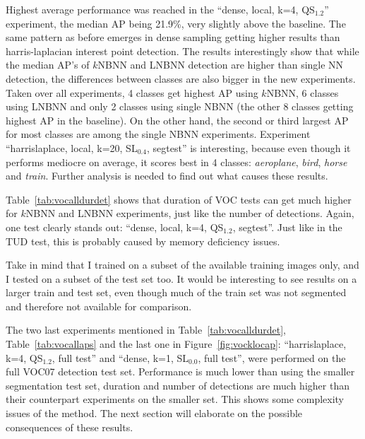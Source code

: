 Highest average performance was reached in the ``dense, local, k=4, QS$_{1.2}$'' experiment, the median AP being 21.9\%, very slightly above the baseline. The same pattern as before emerges in dense sampling getting higher results than harris-laplacian interest point detection. The results interestingly show that while the median AP's of $k$NBNN and LNBNN detection are higher than single NN detection, the differences between classes are also bigger in the new experiments. Taken over all experiments, 4 classes get highest AP using $k$NBNN, 6 classes using LNBNN and only 2 classes using single NBNN (the other 8 classes getting highest AP in the baseline). On the other hand, the second or third largest AP for most classes are among the single NBNN experiments. Experiment ``harrislaplace, local, k=20, SL$_{0.4}$, segtest'' is interesting, because even though it performs mediocre on average, it scores best in 4 classes: \emph{aeroplane}, \emph{bird}, \emph{horse} and \emph{train}. Further analysis is needed to find out what causes these results.

Table~\ref{tab:vocalldurdet} shows that duration of VOC tests can get much higher for $k$NBNN and LNBNN experiments, just like the number of detections. Again, one test clearly stands out: ``dense, local, k=4, QS$_{1.2}$, segtest''. Just like in the TUD test, this is probably caused by memory deficiency issues.

Take in mind that I trained on a subset of the available training images only, and I tested on a subset of the test set too. It would be interesting to see results on a larger train and test set, even though much of the train set was not segmented and therefore not available for comparison.

The two last experiments mentioned in Table~\ref{tab:vocalldurdet}, Table~\ref{tab:vocallaps} and the last one in Figure~\ref{fig:vocklocap}: ``harrislaplace, k=4, QS$_{1.2}$, full test'' and ``dense, k=1, SL$_{0.0}$, full test'',  were performed on the full VOC07 detection test set. Performance is much lower than using the smaller segmentation test set, duration and number of detections are much higher than their counterpart experiments on the smaller set. This shows some complexity issues of the method. The next section will elaborate on the possible consequences of these results.


